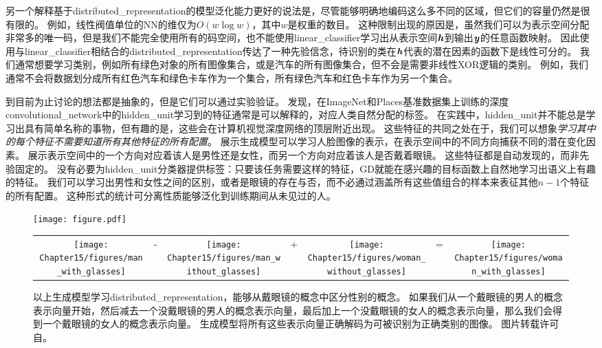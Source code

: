 另一个解释基于\gls{distributed_representation}的模型泛化能力更好的说法是，尽管能够明确地编码这么多不同的区域，但它们的容量仍然是很有限的。
例如，线性阀值单位的\gls{NN}的维仅为$O(w\log w)$，其中$w$是权重的数目\citep{sontag1998vc}。
这种限制出现的原因是，虽然我们可以为表示空间分配非常多的唯一码，但是我们不能完全使用所有的码空间，也不能使用\gls{linear_classifier}学习出从表示空间$\boldsymbol{\mathit{h}}$到输出$\boldsymbol{\mathit{y}}$的任意函数映射。
因此使用与\gls{linear_classifier}相结合的\gls{distributed_representation}传达了一种先验信念，待识别的类在$\boldsymbol{\mathit{h}}$代表的潜在因素的函数下是线性可分的。
我们通常想要学习类别，例如所有绿色对象的所有图像集合，或是汽车的所有图像集合，但不会是需要非线性XOR逻辑的类别。
例如，我们通常不会将数据划分成所有红色汽车和绿色卡车作为一个集合，所有绿色汽车和红色卡车作为另一个集合。


到目前为止讨论的想法都是抽象的，但是它们可以通过实验验证。
\cite{Zhou-et-al-ICLR2015}发现，在ImageNet和Places基准数据集上训练的深度\gls{convolutional_network}中的\gls{hidden_unit}学习到的特征通常是可以解释的，对应人类自然分配的标签。
在实践中，\gls{hidden_unit}并不能总是学习出具有简单名称的事物，但有趣的是，这些会在计算机视觉深度网络的顶层附近出现。
这些特征的共同之处在于，我们可以想象\emph{学习其中的每个特征不需要知道所有其他特征的所有配置}。
\cite{radford2015unsupervised}展示生成模型可以学习人脸图像的表示，在表示空间中的不同方向捕获不同的潜在变化因素。
展示表示空间中的一个方向对应着该人是男性还是女性，而另一个方向对应着该人是否戴着眼镜。
这些特征都是自动发现的，而非先验固定的。
没有必要为\gls{hidden_unit}分类器提供标签：只要该任务需要这样的特征，\gls{GD}就能在感兴趣的目标函数上自然地学习出语义上有趣的特征。
我们可以学习出男性和女性之间的区别，或者是眼镜的存在与否，而不必通过涵盖所有这些值组合的样本来表征其他$n-1$个特征的所有配置。
这种形式的统计可分离性质能够泛化到训练期间从未见过的人。

\begin{figure}[!htb]
\ifOpenSource
\centerline{\texttt{[image: figure.pdf]}}
\else
\begin{tabular}{ccccccc}
\texttt{[image: Chapter15/figures/man\_with\_glasses]} &
- &
\texttt{[image: Chapter15/figures/man\_without\_glasses]} &
+ &
\texttt{[image: Chapter15/figures/woman\_without\_glasses]} &
= &
\texttt{[image: Chapter15/figures/woman\_with\_glasses]}
\end{tabular}
\fi
\caption{以上生成模型学习\gls{distributed_representation}，能够从戴眼镜的概念中区分性别的概念。
如果我们从一个戴眼镜的男人的概念表示向量开始，然后减去一个没戴眼镜的男人的概念表示向量，最后加上一个没戴眼镜的女人的概念表示向量，那么我们会得到一个戴眼镜的女人的概念表示向量。
生成模型将所有这些表示向量正确解码为可被识别为正确类别的图像。
图片转载许可自\cite{radford2015unsupervised}。
}
\label{fig:chap15_generative_glasses}
\end{figure}


